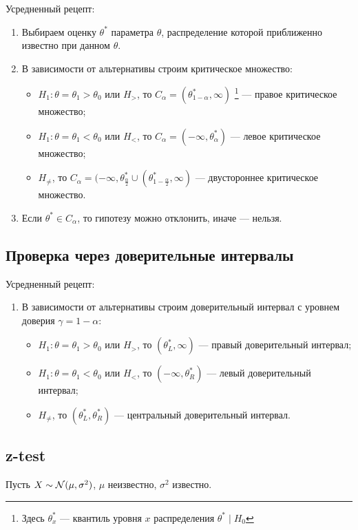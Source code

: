 \documentclass[11pt]{book}
\begin{document}
Усредненный рецепт:
\begin{enumerate}
	\item Выбираем оценку $\theta^*$ параметра $\theta$, распределение которой приближенно известно при данном $\theta$.
	\item В зависимости от альтернативы строим критическое множество:
		\begin{itemize}
			\item $H_1\colon \theta = \theta_1 > \theta_0$ или $H_{>}$, то $C_{\alpha} = (\theta^*_{1-\alpha}, \infty)$ \footnote{Здесь $\theta^*_{x}$ --- квантиль уровня $x$ распределения $\theta^* \mid H_0$} --- правое критическое множество;
			\item $H_1\colon \theta = \theta_1 < \theta_0$ или $H_{<}$, то $C_{\alpha} = (-\infty, \theta^*_{\alpha})$ --- левое критическое множество;
			\item $H_{\neq}$, то $C_{\alpha} = (-\infty, \theta^*_{\frac{\alpha}{2}} \cup (\theta^*_{1 - \frac{\alpha}{2}}, \infty)$ --- двустороннее критическое множество.
		\end{itemize}
	\item Если $\theta^* \in  C_{\alpha}$, то гипотезу можно отклонить, иначе --- нельзя.
\end{enumerate}

\subsection{Проверка через доверительные интервалы}
Усредненный рецепт:
\begin{enumerate}
	\item В зависимости от альтернативы строим доверительный интервал с уровнем доверия $\gamma = 1 - \alpha$:
		\begin{itemize}
			\item $H_1\colon \theta = \theta_1 > \theta_0$ или $H_{>}$, то $(\theta^*_{L}, \infty)$ --- правый доверительный интервал;
			\item $H_1\colon \theta = \theta_1 < \theta_0$ или $H_{<}$, то $(-\infty, \theta^*_{R})$ --- левый доверительный интервал;
			\item $H_{\neq}$, то $(\theta^*_{L} , \theta^*_{R})$ --- центральный доверительный интервал.
		\end{itemize}
\end{enumerate}

\subsection{z-test}
Пусть $X \sim \mathcal{N}(\mu, \sigma^2)$, $\mu$ неизвестно, $\sigma^2$ известно.
\end{document}
